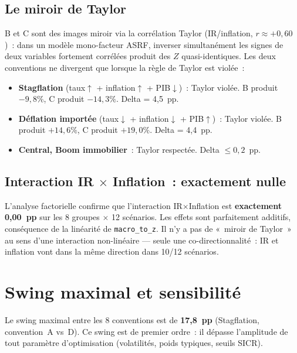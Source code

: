 \documentclass[12pt, a4paper, twoside, openright]{report}
\theoremstyle{definition}
\begin{document}
\subsection{Le miroir de Taylor}

B et C sont des images miroir via la corrélation Taylor (IR/inflation, $r \approx +0{,}60$)~: dans un modèle mono-facteur ASRF, inverser simultanément les signes de deux variables fortement corrélées produit des $Z$ quasi-identiques. Les deux conventions ne divergent que lorsque la règle de Taylor est violée~:

\begin{itemize}
\item \textbf{Stagflation} (taux$\uparrow$ + inflation$\uparrow$ + PIB$\downarrow$)~: Taylor violée. B produit $-9{,}8\%$, C produit $-14{,}3\%$. Delta = 4,5~pp.
\item \textbf{Déflation importée} (taux$\downarrow$ + inflation$\downarrow$ + PIB$\uparrow$)~: Taylor violée. B produit $+14{,}6\%$, C produit $+19{,}0\%$. Delta = 4,4~pp.
\item \textbf{Central, Boom immobilier}~: Taylor respectée. Delta $\leq 0{,}2$~pp.
\end{itemize}

\subsection{Interaction IR $\times$ Inflation~: exactement nulle}

L'analyse factorielle confirme que l'interaction IR$\times$Inflation est \textbf{exactement 0,00~pp} sur les 8 groupes $\times$ 12 scénarios. Les effets sont parfaitement additifs, conséquence de la linéarité de \texttt{macro\_to\_z}. Il n'y a pas de «~miroir de Taylor~» au sens d'une interaction non-linéaire --- seule une co-directionnalité~: IR et inflation vont dans la même direction dans 10/12 scénarios.


\section{Swing maximal et sensibilité}
\label{sec:conv-swing}

Le swing maximal entre les 8 conventions est de \textbf{17,8~pp} (Stagflation, convention~A vs~D). Ce swing est de premier ordre~: il dépasse l'amplitude de tout paramètre d'optimisation (volatilités, poids typiques, seuils SICR).
\end{document}
